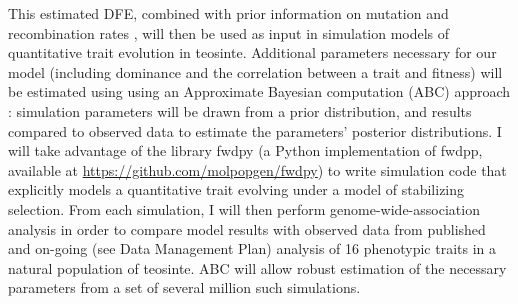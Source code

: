 

This estimated DFE, combined with prior information on mutation \citep{Clark:2005} and recombination rates \citep{Rodgers-Melnick:2014}, will then be used as input in simulation models of quantitative trait evolution in teosinte. Additional parameters necessary for our model (including dominance and the correlation between a trait and fitness) will be estimated using using an Approximate Bayesian computation (ABC) approach \citep{Beaumont:2002ue}: simulation parameters will be drawn from a prior distribution, and results compared to observed data to estimate the parameters' posterior distributions. I will take advantage of the library fwdpy (a Python implementation of fwdpp, \citealt{Thornton:2014kn} available at \url{https://github.com/molpopgen/fwdpy}) to write simulation code that explicitly models a quantitative trait evolving under a model of stabilizing selection. From each simulation, I will then perform genome-wide-association analysis in order to compare model results with observed data from published \citep{Weber:2009} and on-going (see Data Management Plan) analysis of 16 phenotypic traits in a natural population of teosinte. ABC will allow robust estimation of the necessary parameters from a set of several million such simulations.

